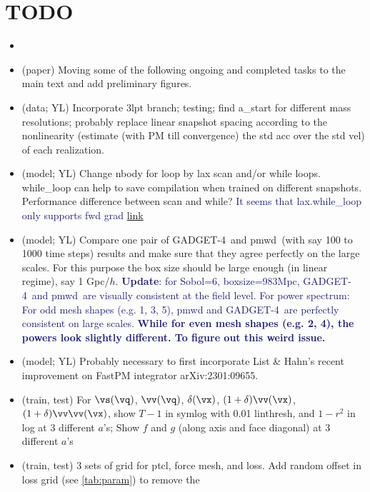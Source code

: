 \documentclass[modern, trackchanges, dvipsnames]{aastex631}
\newcommand{\pmwd}{{\usefont{T1}{nova}{m}{sl}pmwd}}
\newcommand{\GADGET}{{{\fontsize{10pt}{12pt}\selectfont GADGET}-4}}
\newcommand{\YZ}[1]{\textcolor{MidnightBlue}{#1}}
\begin{document}
\section*{TODO}
\begin{itemize}
\item

\item (paper) Moving some of the following ongoing and completed tasks
  to the main text and add preliminary figures.
\item (data; YL) Incorporate 3lpt branch; testing; find a\_start for
  different mass resolutions; probably replace linear snapshot spacing
  according to the nonlinearity (estimate (with PM till convergence) the
  std acc over the std vel) of each realization.
\item (model; YL) Change nbody for loop by lax scan and/or while loops.
  while\_loop can help to save compilation when trained on different
  snapshots. Performance difference between scan and while?\newline
  \YZ{It seems that lax.while\_loop only supports fwd grad}
  \href{https://jax.readthedocs.io/en/latest/notebooks/Common_Gotchas_in_JAX.html#summary}{link}
\item (model; YL) Compare one pair of \GADGET\ and \pmwd\ (with say 100 to 1000 time
    steps) results and make sure that they agree perfectly on the large
    scales. For this purpose the box size should be large enough (in
    linear regime), say 1 Gpc/$h$.\newline
    \YZ{\textbf{Update}: for Sobol=6, boxsize=983Mpc, \GADGET\ and \pmwd\ are
    visually consistent at the field level. For power spectrum: For
    odd mesh shapes (e.g. 1, 3, 5), pmwd and \GADGET\ are perfectly consistent
    on large scales. \textbf{While for even mesh shapes (e.g. 2, 4), the powers
    look slightly different. To figure out this weird issue.}}
\item (model; YL) Probably necessary to first incorporate List \& Hahn's
  recent improvement on FastPM integrator arXiv:2301:09655.
\item (train, test) For $\vs(\vq)$, $\vv(\vq)$, $\delta(\vx)$,
  $(1+\delta)\vv(\vx)$, $(1+\delta)\vv\vv(\vx)$, show $T - 1$ in symlog
  with 0.01 linthresh, and $1-r^2$ in log at 3 different $a$'s; Show $f$
  and $g$ (along axis and face diagonal) at 3 different $a$'s
\item (train, test) 3 sets of grid for ptcl, force mesh, and loss. Add
  random offset in loss grid (see \autoref{tab:param}) to remove the

\end{itemize}
\end{document}
